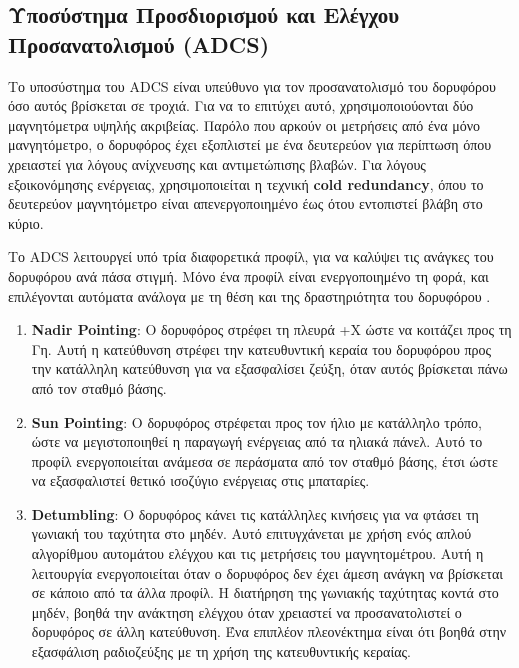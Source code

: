 \documentclass[a4paper,nobib,justified]{tufte-book}
\begin{document}
\subsection{Υποσύστημα Προσδιορισμού και Ελέγχου Προσανατολισμού (\acs{ADCS})}
Το υποσύστημα του \acs{ADCS} είναι υπεύθυνο για τον προσανατολισμό του δορυφόρου όσο αυτός βρίσκεται σε τροχιά. Για να το επιτύχει αυτό, χρησιμοποιούονται δύο μαγνητόμετρα υψηλής ακριβείας. Παρόλο που αρκούν οι μετρήσεις από ένα μόνο μανγητόμετρο, ο δορυφόρος έχει εξοπλιστεί με ένα δευτερεύον για περίπτωση όπου χρειαστεί για λόγους ανίχνευσης και αντιμετώπισης βλαβών. Για λόγους εξοικονόμησης ενέργειας, χρησιμοποιείται η τεχνική \textbf{cold redundancy}, όπου το δευτερεύον μαγνητόμετρο είναι απενεργοποιημένο έως ότου εντοπιστεί βλάβη στο κύριο.

Το \acs{ADCS} λειτουργεί υπό τρία διαφορετικά προφίλ, για να καλύψει τις ανάγκες του δορυφόρου ανά πάσα στιγμή. Μόνο ένα προφίλ είναι ενεργοποιημένο τη φορά, και επιλέγονται αυτόματα ανάλογα με τη θέση και της δραστηριότητα του δορυφόρου .
\begin{enumerate}
    \item \textbf{Nadir Pointing}: Ο δορυφόρος στρέφει τη πλευρά +X ώστε να κοιτάζει προς τη Γη. Αυτή η κατεύθυνση στρέφει την κατευθυντική κεραία του δορυφόρου προς την κατάλληλη κατεύθυνση για να εξασφαλίσει ζεύξη, όταν αυτός βρίσκεται πάνω από τον σταθμό βάσης. 
    \item \textbf{Sun Pointing}: Ο δορυφόρος στρέφεται προς τον ήλιο με κατάλληλο τρόπο, ώστε να μεγιστοποιηθεί η παραγωγή ενέργειας από τα ηλιακά πάνελ. Αυτό το προφίλ ενεργοποιείται ανάμεσα σε περάσματα από τον σταθμό βάσης, έτσι ώστε να εξασφαλιστεί θετικό ισοζύγιο ενέργειας στις μπαταρίες.
    \item \textbf{Detumbling}: Ο δορυφόρος κάνει τις κατάλληλες κινήσεις για να φτάσει τη γωνιακή του ταχύτητα στο μηδέν. Αυτό επιτυγχάνεται με χρήση ενός απλού αλγορίθμου αυτομάτου ελέγχου και τις μετρήσεις του μαγνητομέτρου. Αυτή η λειτουργία ενεργοποιείται όταν ο δορυφόρος δεν έχει άμεση ανάγκη να βρίσκεται σε κάποιο από τα άλλα προφίλ. Η διατήρηση της γωνιακής ταχύτητας κοντά στο μηδέν, βοηθά την ανάκτηση ελέγχου όταν χρειαστεί να προσανατολιστεί ο δορυφόρος σε άλλη κατεύθυνση. Ένα επιπλέον πλεονέκτημα είναι ότι βοηθά στην εξασφάλιση ραδιοζεύξης με τη χρήση της κατευθυντικής κεραίας.
\end{enumerate}
\end{document}

